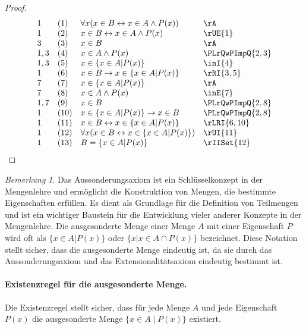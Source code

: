 \documentclass{book}
\theoremstyle{plain}
\theoremstyle{remark}
\newtheorem*{remark}{Bemerkung}
\theoremstyle{definition}
\begin{document}
\begin{proof}
	\[
	\begin{array}{llll}
		1 & (1) & \forall x(x\in B\leftrightarrow x\in A\land P(x)) & \rA \\
		1 & (2) & x\in B\leftrightarrow x\in A\land P(x) & \rUE{1} \\
		3 & (3) & x\in B & \rA \\
		1,3 & (4) & x\in A\land P(x) & \PLrQwPImpQ{2,3} \\
		1,3 & (5) & x\in \{x\in A|P(x)\} & \inI{4} \\
		1 & (6) & x\in B\rightarrow x\in \{x\in A|P(x)\} & \rRI{3,5} \\
		7 & (7) & x\in \{x\in A|P(x)\} & \rA \\
		7 & (8) & x\in A\land P(x) & \inE{7} \\
		1,7 & (9) & x\in B & \PLrQwPImpQ{2,8} \\
		1 & (10) & x\in \{x\in A|P(x)\}\rightarrow x\in B & \PLrQwPImpQ{2,8} \\			
		1 & (11) & x\in B\leftrightarrow x\in \{x\in A|P(x)\} & \rLRI{6,10} \\						
		1 & (12) & \forall x(x\in B\leftrightarrow x\in \{x\in A|P(x)\}) & \rUI{11} \\	
		1 & (13) & B=\{x\in A|P(x)\} & \rIISet{12} \\	
	\end{array}
	\]
\end{proof}

\begin{remark}
	Das Aussonderungsaxiom ist ein Schlüsselkonzept in der Mengenlehre und ermöglicht die Konstruktion von Mengen, die bestimmte Eigenschaften erfüllen. Es dient als Grundlage für die Definition von Teilmengen und ist ein wichtiger Baustein für die Entwicklung vieler anderer Konzepte in der Mengenlehre. Die ausgesonderte Menge einer Menge \( A \) mit einer Eigenschaft \( P \) wird oft als \( \{ x \in A | P(x) \} \) oder \( \{ x | x \in A          \cap P(x) \} \) bezeichnet. Diese Notation stellt sicher, dass die ausgesonderte Menge eindeutig ist, da sie durch das Aussonderungsaxiom und das Extensionalitätsaxiom eindeutig bestimmt ist.
\end{remark}

\paragraph{Existenzregel für die ausgesonderte Menge.}
\label{rule:comprehensionSetExists}
Die Existenzregel stellt sicher, dass für jede Menge \(A\) und jede Eigenschaft \(P(x)\) die ausgesonderte Menge \(\{x \in A \mid P(x)\}\) existiert.
\end{document}
